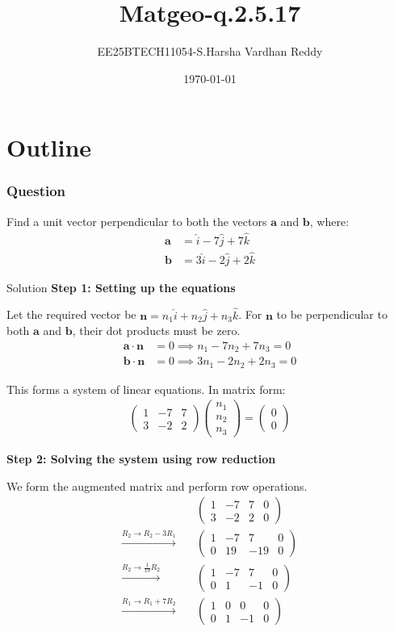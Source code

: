 \documentclass{beamer}
\title{Matgeo-q.2.5.17}
\author{EE25BTECH11054-S.Harsha Vardhan Reddy}
\date{\today}
\theoremstyle{remark}
\newcommand{\myvec}[1]{\ensuremath{\begin{pmatrix}#1\end{pmatrix}}}
\let\vec\mathbf
\begin{document}
\begin{frame}
\titlepage
\end{frame}

\section*{Outline}


\begin{frame}
\frametitle{Question}
Find a unit vector perpendicular to both the vectors $\vec{a}$ and $\vec{b}$, where:
\begin{align}
\vec{a} &= \hat{i} - 7\hat{j} + 7\hat{k} \label{eq:a_vec}\\
\vec{b} &= 3\hat{i} - 2\hat{j} + 2\hat{k} \label{eq:b_vec}
\end{align}
\end{frame}

\begin{frame}[t]{Solution}
\small
\textbf{Step 1: Setting up the equations}

Let the required vector be $\vec{n} = n_1\hat{i} + n_2\hat{j} + n_3\hat{k}$. For $\vec{n}$ to be perpendicular to both $\vec{a}$ and $\vec{b}$, their dot products must be zero.
\begin{align}
\vec{a} \cdot \vec{n} &= 0 \implies n_1 - 7n_2 + 7n_3 = 0 \label{eq:orth1}\\
\vec{b} \cdot \vec{n} &= 0 \implies 3n_1 - 2n_2 + 2n_3 = 0 \label{eq:orth2}
\end{align}

This forms a system of linear equations. In matrix form:
\begin{align}
\myvec{
1 & -7 & 7\\
3 & -2 & 2
}
\myvec{n_1\\n_2\\n_3}
= \myvec{0\\0} \label{eq:system}
\end{align}
\end{frame}

\begin{frame}
\small
\textbf{Step 2: Solving the system using row reduction}

We form the augmented matrix and perform row operations.
\begin{align}
&\myvec{
1 & -7 & 7 & 0\\
3 & -2 & 2 & 0
} \label{eq:aug} \\
\xrightarrow{R_2 \to R_2 - 3R_1} \quad &\myvec{
1 & -7 & 7 & 0\\
0 & 19 & -19 & 0
} \label{eq:row1} \\
\xrightarrow{R_2 \to \tfrac{1}{19}R_2} \quad &\myvec{
1 & -7 & 7 & 0\\
0 & 1 & -1 & 0
} \label{eq:row2} \\
\xrightarrow{R_1 \to R_1 + 7R_2} \quad &\myvec{
1 & 0 & 0 & 0\\
0 & 1 & -1 & 0
} \label{eq:row3}
\end{align}
\end{frame}
\end{document}
